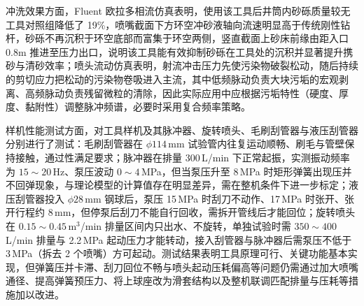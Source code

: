 冲洗效果方面，Fluent 欧拉多相流仿真表明，使用该工具后井筒内砂砾质量较无工具对照组降低了 19\%，喷嘴截面下方环空冲砂液轴向流速明显高于传统刚性钻杆，砂砾不再沉积于环空底部而富集于环空两侧，竖直截面上砂床前缘由距入口 $0.8\mathrm{m}$ 推进至压力出口，说明该工具能有效抑制砂砾在工具处的沉积并显著提升携砂与清砂效率；喷头流动仿真表明，射流冲击压力先使污染物破裂松动，随后持续的剪切应力把松动的污染物卷吸进入主流，其中低频脉动负责大块污垢的宏观剥离、高频脉动负责残留微粒的清除，因此实际应用中应根据污垢特性（硬度、厚度、黏附性）调整脉冲频谱，必要时采用复合频率策略。

样机性能测试方面，对工具样机及其脉冲器、旋转喷头、毛刷刮管器与液压刮管器分别进行了测试：毛刷刮管器在 $\phi 114$\,mm 试验管内往复运动顺畅、刷毛与管壁保持接触，通过性满足要求；脉冲器在排量 300\,L/min 下正常起振，实测振动频率为 $15\sim20$\,Hz、泵压波动 $0\sim4$\,MPa，但当泵压升至 8\,MPa 时矩形弹簧出现压并不回弹现象，与理论模型的计算值存在明显差异，需在整机条件下进一步标定；液压刮管器投入 $\phi 28$\,mm 钢球后，泵压 15\,MPa 时刮刀不动作、17\,MPa 时张开、张开行程约 8\,mm，但停泵后刮刀不能自行回收，需拆开管线后才能回位；旋转喷头在 $0.15\sim0.45$\,m$^3$/min 排量区间内只出水、不旋转，单独试验时需 $350\sim400$\,L/min 排量与 2.2\,MPa 起动压力才能转动，接入刮管器与脉冲器后需泵压不低于 3\,MPa（拆去 2 个喷嘴）方可起动。测试结果表明工具原理可行、关键功能基本实现，但弹簧压并卡滞、刮刀回位不畅与喷头起动压耗偏高等问题仍需通过加大喷嘴通径、提高弹簧预压力、将上球座改为滑套结构以及整机联调匹配排量与压耗等措施加以改进。


